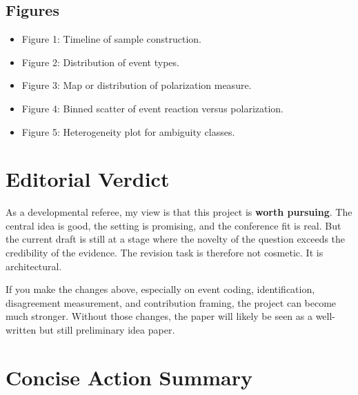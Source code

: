 \documentclass[12pt]{article}
\begin{document}
\subsection*{Figures}
\begin{itemize}[leftmargin=2em]
    \item Figure 1: Timeline of sample construction.
    \item Figure 2: Distribution of event types.
    \item Figure 3: Map or distribution of polarization measure.
    \item Figure 4: Binned scatter of event reaction versus polarization.
    \item Figure 5: Heterogeneity plot for ambiguity classes.
\end{itemize}

\section{Editorial Verdict}
As a developmental referee, my view is that this project is \textbf{worth pursuing}. The central idea is good, the setting is promising, and the conference fit is real. But the current draft is still at a stage where the novelty of the question exceeds the credibility of the evidence. The revision task is therefore not cosmetic. It is architectural.

If you make the changes above, especially on event coding, identification, disagreement measurement, and contribution framing, the project can become much stronger. Without those changes, the paper will likely be seen as a well-written but still preliminary idea paper.

\section*{Concise Action Summary}
\begin{center}
\end{center}
\end{document}
